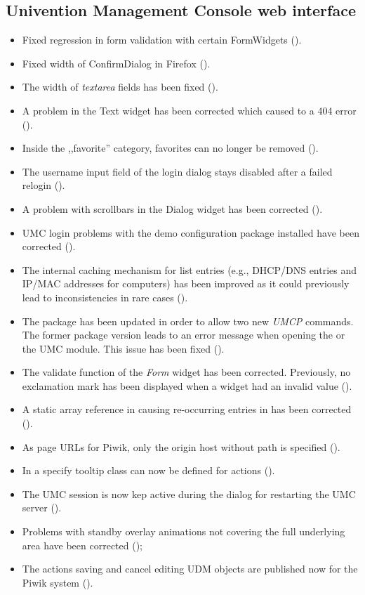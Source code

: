 \subsection{Univention Management Console web interface}
\begin{itemize}
\item Fixed regression in form validation with certain FormWidgets
  ().
\item Fixed width of ConfirmDialog in Firefox ().
\item The width of \emph{textarea} fields has been fixed
  ().
\item A problem in the Text widget has been corrected which caused to
  a 404 error ().
\item Inside the ,,favorite'' category, favorites can no longer be
  removed ().
\item The username input field of the login dialog stays disabled
  after a failed relogin ().
\item A problem with scrollbars in the Dialog widget has been
  corrected ().
\item UMC login problems with the demo configuration package installed have
  been corrected ().
\item The internal caching mechanism for list entries (e.g., DHCP/DNS
  entries and IP/MAC addresses for computers) has been improved as it
  could previously lead to inconsistencies in rare cases ().
\item The  package has been
  updated in order to allow two new \emph{UMCP} commands. The former
  package version leads to an error message when opening the
   or the  UMC module. This
  issue has been fixed ().
\item The validate function of the \emph{Form} widget has been corrected.
  Previously, no exclamation mark has been displayed when a widget had an
  invalid value ().
\item A static array reference in  causing re-occurring
  entries in  has been corrected ().
\item As page URLs for Piwik, only the origin host without path is specified ().
\item In  a specify tooltip class can now be defined for actions ().
\item The UMC session is now kep active during the dialog for restarting the UMC server ().
\item Problems with standby overlay animations not covering the full underlying area have been corrected ();
\item The actions saving and cancel editing UDM objects are published now for the Piwik system ().
\end{itemize}

